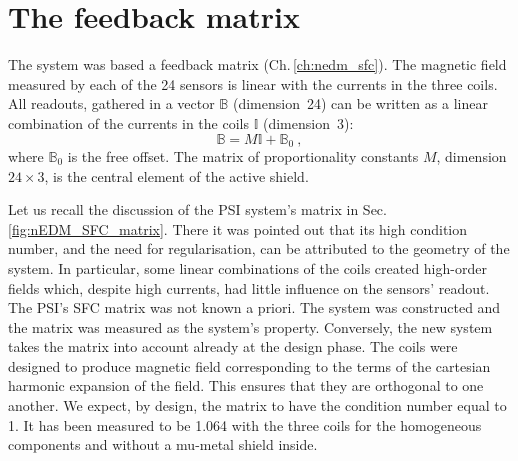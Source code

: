 \section{The feedback matrix}
The system was based a feedback matrix (Ch.\,\ref{ch:nedm_sfc}). The magnetic field measured by each of the 24 sensors is linear with the currents in the three coils. All readouts, gathered in a vector $\mathbb{B}$ (dimension~24) can be written as a linear combination of the currents in the coils $\mathbb{I}$ (dimension~3):
\begin{equation}
  \label{eq:SFC_matrix_model}
  \mathbb{B} = M \mathbb{I} + \mathbb{B}_0 \ ,
\end{equation}
where $\mathbb{B}_0$ is the free offset. The matrix of proportionality constants $M$, dimension $24 \times 3$, is the central element of the active shield.

Let us recall the discussion of the PSI system's matrix in Sec.\,\ref{fig:nEDM_SFC_matrix}. There it was pointed out that its high condition number, and the need for regularisation, can be attributed to the geometry of the system. In particular, some linear combinations of the coils created high-order fields which, despite high currents, had little influence on the sensors' readout.
The PSI's SFC matrix was not known a priori. The system was constructed and the matrix was measured as the system's property.
Conversely, the new system takes the matrix into account already at the design phase. The coils were designed to produce magnetic field corresponding to the terms of the cartesian harmonic expansion of the field.
This ensures that they are orthogonal to one another. We expect, by design, the matrix to have the condition number equal to \num{1}. It has been measured to be \num{1.064} with the three coils for the homogeneous components and without a mu-metal shield inside.


